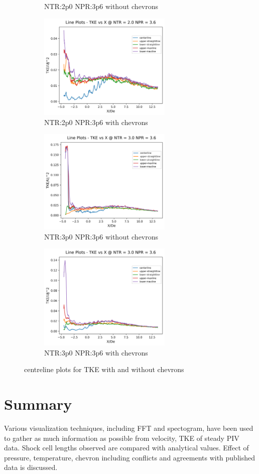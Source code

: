 \begin{figure}[H]
\begin{subfigure}{.5\textwidth}
	\caption{NTR:2p0 NPR:3p6 without chevrons}
	\label{fig:setup1}
\end{subfigure}%
\begin{subfigure}{.5\textwidth}
	\centering
	\includegraphics[width=2.5in]{images/LinePlots_TKE_NTR2p0_NPR3p6c.png}
	\caption{NTR:2p0 NPR:3p6 with chevrons}
	\label{fig:setup2}
\end{subfigure}
\begin{subfigure}{.5\textwidth}
	\centering
	\includegraphics[width=2.5in]{images/LinePlots_TKE_NTR3p0_NPR3p6.png}
	\caption{NTR:3p0 NPR:3p6 without chevrons}
	\label{fig:setup1}
\end{subfigure}%
\begin{subfigure}{.5\textwidth}
	\centering
	\includegraphics[width=2.5in]{images/LinePlots_TKE_NTR3p0_NPR3p6c.png}
	\caption{NTR:3p0 NPR:3p6 with chevrons}
	\label{fig:setup2}
\end{subfigure}
\caption{centreline plots for TKE with and without chevrons }
\label{fig:lineplotsTKE}
\end{figure}

\section{Summary}

Various visualization techniques, including FFT and spectogram, have been used to gather as much information as possible from velocity, TKE of steady PIV data. Shock cell lengths observed are compared with analytical values. Effect of pressure, temperature, chevron including conflicts and agreements with published data is discussed. 

%
